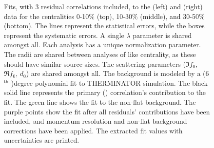 \documentclass[/home/jesse/Analysis/FemtoAnalysis/AnalysisNotes/AnalysisNoteJBuxton.tex]{subfiles}
\renewcommand{\NonFlatBgdLamKs}{_NonFlatBgdCrctnLinear}
\renewcommand{\ResNum}{_3Res}
\renewcommand{\PrimMaxDecay}{_PrimMaxDecay10fm}
\renewcommand{\SaveNameModLamKs}{\MomRes\NonFlatBgdLamKs\ResNum\PrimMaxDecay\ResMethod\ParamFixAndShareLamKs}
\begin{document}
\pagestyle{empty}
\begin{landscape}

\begin{figure}[h!]
  \centering
  \caption[\LamALamKs Fits with 3 Residuals]{Fits, with 3 residual correlations included, to the \LamKs (left) and \ALamKs (right) data for the centralities 0-10\% (top), 10-30\% (middle), and 30-50\% (bottom).
 The lines represent the statistical errors, while the boxes represent the systematic errors.
 A single $\lambda$ parameter is shared amongst all.
 Each analysis has a unique normalization parameter.
 The radii are shared between analyses of like centrality, as these should have similar source sizes.
 The scattering parameters ($\Im f_{0}$, $\Re f_{0}$, $d_{0}$) are shared amongst all.
 The background is modeled by a (6$^{\mathrm{th}}$-)degree polynomial fit to THERMINATOR simulation.
 The black solid line represents the primary (\LamK) correlation's contribution to the fit.  
 The green line shows the fit to the non-flat background.
 The purple points show the fit after all residuals' contributions have been included, and momentum resolution and non-flat background corrections have been applied.
 The extracted fit values with uncertainties are printed.}
  \label{fig:LamK0wConjFits_3Res}
\end{figure}




\end{landscape}
\end{document}
